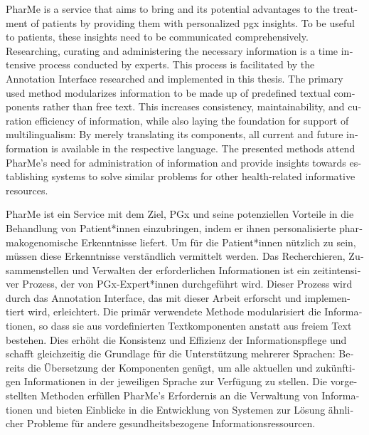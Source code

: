 \null\vfil
\begin{otherlanguage}{english}
\begin{center}\textsf{\textbf{\abstractname}}\end{center}

    \noindent PharMe is a service that aims to bring  and its
    potential advantages to the treatment of patients by providing them with
    personalized \gls{pgx} insights. To be useful to patients, these insights
    need to be communicated comprehensively. Researching, curating and
    administering the necessary information is a time intensive process
    conducted by  experts. This process is facilitated by the
    Annotation Interface researched and implemented in this thesis. The primary
    used method modularizes information to be made up of predefined textual
    components rather than free text. This increases consistency,
    maintainability, and curation efficiency of information, while also laying
    the foundation for support of multilingualism: By merely translating its
    components, all current and future information is available in the
    respective language. The presented methods attend PharMe's need for
    administration of information and provide insights towards establishing
    systems to solve similar problems for other health-related informative
    resources.

\end{otherlanguage}
\vfil\null

\null\vfil
\begin{otherlanguage}{ngerman}
\begin{center}\textsf{\textbf{\abstractname}}\end{center}

    \noindent PharMe ist ein Service mit dem Ziel, PGx und seine potenziellen
    Vorteile in die Behandlung von Patient*innen einzubringen, indem er ihnen
    personalisierte pharmakogenomische Erkenntnisse liefert. Um für die
    Patient*innen nützlich zu sein, müssen diese Erkenntnisse verständlich
    vermittelt werden. Das Recherchieren, Zusammenstellen und Verwalten der
    erforderlichen Informationen ist ein zeitintensiver Prozess, der von
    PGx-Expert*innen durchgeführt wird. Dieser Prozess wird durch das
    Annotation Interface, das mit dieser Arbeit erforscht und implementiert
    wird, erleichtert. Die primär verwendete Methode modularisiert die
    Informationen, so dass sie aus vordefinierten Textkomponenten anstatt aus
    freiem Text bestehen. Dies erhöht die Konsistenz und Effizienz der
    Informationspflege und schafft gleichzeitig die Grundlage für die
    Unterstützung mehrerer Sprachen: Bereits die Übersetzung der Komponenten
    genügt, um alle aktuellen und zukünftigen Informationen in der jeweiligen
    Sprache zur Verfügung zu stellen. Die vorgestellten Methoden erfüllen
    PharMe's Erfordernis an die Verwaltung von Informationen und bieten
    Einblicke in die Entwicklung von Systemen zur Lösung ähnlicher Probleme für
    andere gesundheitsbezogene Informationsressourcen.

\end{otherlanguage}
\vfil\null
